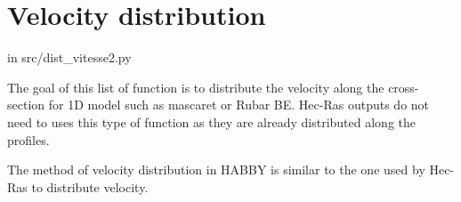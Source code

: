 \documentclass[letterpaper,10pt,english]{sphinxmanual}
\begin{document}
\section{Velocity distribution}
\label{\detokenize{index:velocity-distribution}}
in src/dist\_vitesse2.py

The goal of this list of function is to distribute the velocity along the cross-section
for 1D model such as mascaret or Rubar BE. Hec-Ras outputs do not need to uses this type
of function as they are already distributed along the profiles.

The method of velocity distribution in HABBY is similar to the one used by Hec-Ras to distribute
velocity.
\label{\detokenize{index:module-src.dist_vistess2}}
\end{document}
